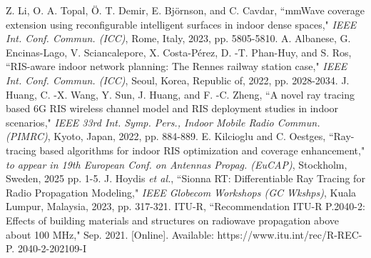 \documentclass{IEEEoj}
\begin{document}
\begin{thebibliography}{00}
	 Z. Li, O. A. Topal, Ö. T. Demir, E. Björnson, and C. Cavdar, “mmWave coverage extension using reconfigurable intelligent surfaces in indoor dense spaces," \textit{IEEE Int. Conf. Commun. (ICC)}, Rome, Italy, 2023, pp. 5805-5810.
	 A. Albanese, G. Encinas-Lago, V. Sciancalepore, X. Costa-Pérez, D. -T. Phan-Huy, and S. Ros, “RIS-aware indoor network planning: The Rennes railway station case," \textit{IEEE Int. Conf. Commun. (ICC)}, Seoul, Korea, Republic of, 2022, pp. 2028-2034.
	 J. Huang, C. -X. Wang, Y. Sun, J. Huang, and F. -C. Zheng, “A novel ray tracing based 6G RIS wireless channel model and RIS deployment studies in indoor scenarios," \textit{IEEE 33rd Int. Symp. Pers., Indoor Mobile Radio Commun. (PIMRC)}, Kyoto, Japan, 2022, pp. 884-889.
	 E. Kilcioglu and C. Oestges, “Ray-tracing based algorithms for indoor RIS optimization and coverage enhancement," \textit{to appear in 19th European Conf. on Antennas Propag. (EuCAP)}, Stockholm, Sweden, 2025 pp. 1-5.
	 J. Hoydis \textit{et al.}, “Sionna RT: Differentiable Ray Tracing for Radio Propagation Modeling," \textit{IEEE Globecom Workshops (GC Wkshps)}, Kuala Lumpur, Malaysia, 2023, pp. 317-321.
	 ITU-R, “Recommendation ITU-R P.2040-2: Effects of building materials and structures on radiowave propagation above about 100 MHz," Sep. 2021. [Online]. Available: https://www.itu.int/rec/R-REC-P. 2040-2-202109-I
\end{thebibliography}
\end{document}

